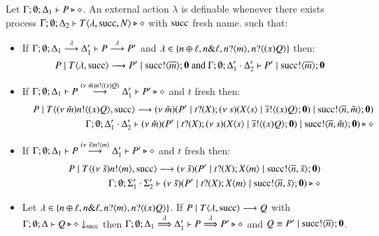 \begin{definition}[Definibility]\rm
	Let $\Gamma; \emptyset; \Delta_1 \vdash P \triangleright \diamond$.
	An external action $\lambda$ is definable whenever
	there exists process
	$\Gamma; \emptyset; \Delta_2 \vdash T\langle \lambda, \textrm{succ}, N \rangle \triangleright \diamond$
	with $\textrm{succ}$ fresh name.%
	such that:
%
	\begin{itemize}
		\item	If $\Gamma; \emptyset; \Delta_1 \stackrel{\lambda}{\longrightarrow} \Delta_1' \vdash P \stackrel{\lambda}{\longrightarrow} P'$ and
			$\lambda \in \{n \oplus \ell, n \& \ell, n ? \langle m \rangle, n ? \langle (x) Q \rangle\}$
			then:
%
\[
			P \;|\; T\langle \lambda, \textrm{succ} \rangle \longrightarrow P' \;|\; \textrm{succ} ! \langle \overline{m} \rangle ; \mathbf{0} \textrm{ and }
			\Gamma; \emptyset; \Delta_1' \cdot \Delta_2' \vdash P' \;|\; \textrm{succ} ! \langle \overline{m} \rangle ; \mathbf{0}
\]
%
		\item	If $\Gamma; \emptyset; \Delta_1 \vdash P \stackrel{(\nu\ \tilde{m})n ! \langle (x)Q \rangle}{\longrightarrow} \Delta_1' \vdash P' \triangleright \diamond$ and $t$ fresh
			then:
%
			\begin{eqnarray*}
				& & P \;|\; T\langle (\nu\ \tilde{m})n ! \langle (x)Q \rangle, \textrm{succ} \rangle \longrightarrow (\nu\ \tilde{m})(P' \;|\; t ? (X) ; (\nu\ s)(X\langle s \rangle \;|\; \overline{s} ! \langle (x) Q \rangle ; \mathbf{0}) \;|\; \textrm{succ} ! \langle \overline{n}, \tilde{m} \rangle ; \mathbf{0})\\
				& & \Gamma; \emptyset; \Delta_1' \cdot \Delta_2' \vdash (\nu\ \tilde{m})(P' \;|\; t ? (X) ; (\nu\ s)(X\langle s \rangle \;|\; \overline{s} ! \langle (x) Q \rangle ; \mathbf{0}) \;|\; \textrm{succ} ! \langle \overline{n}, \tilde{m} \rangle ; \mathbf{0}) \triangleright \diamond
			\end{eqnarray*}
%
		\item	If $\Gamma; \emptyset; \Delta_1 \vdash P \stackrel{(\nu\ \tilde{s})n ! \langle m \rangle}{\longrightarrow} \Delta_1' \vdash P' \triangleright \diamond$
			and $t$ fresh then:
%
			\begin{eqnarray*}
				& & P \;|\; T\langle (\nu\ \tilde{s})n ! \langle m \rangle, \textrm{succ} \rangle \longrightarrow (\nu\ \tilde{s})(P' \;|\; t ? (X) ; X\langle m \rangle \;|\; \textrm{succ} ! \langle \overline{n}, \tilde{s} \rangle ; \mathbf{0})\\
				& & \Gamma; \emptyset; \Sigma_1' \cdot \Sigma_2' \vdash (\nu\ \tilde{s})(P' \;|\; t ? (X) ; X\langle m \rangle \;|\; \textrm{succ} ! \langle \overline{n}, \tilde{s} \rangle ; \mathbf{0}) \triangleright \diamond
			\end{eqnarray*}
%
		\item	Let $\lambda \in \{n \oplus \ell, n \& \ell, n ? \langle m \rangle, n ? \langle (x) Q \rangle\}$.
			If $P \;|\; T\langle \lambda, \textrm{succ} \rangle \longrightarrow Q$ with			
			$\Gamma; \emptyset; \Delta \vdash Q \triangleright \diamond \downarrow_{\textrm{succ}}$ then 
			$\Gamma; \emptyset; \Delta_1 \stackrel{\lambda}{\Longrightarrow} \Delta_1' \vdash P \stackrel{\lambda}{\Longrightarrow} P' \triangleright \diamond$
			and $Q \equiv P' \;|\; \textrm{succ} ! \langle \overline{n} \rangle ; \mathbf{0}$.


\end{itemize}
\end{definition}
